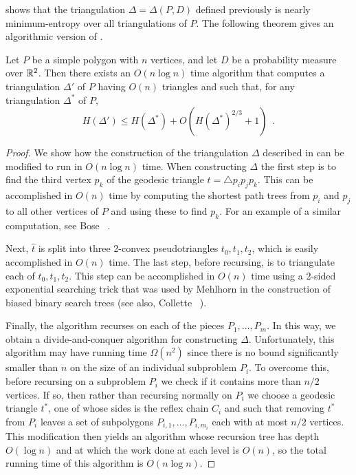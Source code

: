 \documentclass[lotsofwhite]{patmorin}
\newcommand{\z}[1]{{\hat{#1}}}
\begin{document}
 shows that the triangulation
$\Delta=\Delta(P,D)$ defined previously is nearly minimum-entropy over
all triangulations of $P$.  The following theorem gives an algorithmic
version of .

\begin{thm}
Let $P$ be a simple polygon with $n$ vertices, and let $D$ be a
probability measure over $\mathbb{R}^2$.  Then there exists an $O(n\log n)$
time algorithm that computes a triangulation $\Delta'$ of $P$ having
$O(n)$ triangles and such that, for any triangulation $\Delta^*$ of
$P$,
\[
    H(\Delta') \le H(\Delta^*) + O(H(\Delta^*)^{2/3}+1) \enspace .
\]
\end{thm}

\begin{proof}
We show how the construction of the triangulation $\Delta$ described in
 can be modified to run in $O(n\log n)$ time.  When
constructing $\Delta$ the first step is to find the third vertex $p_k$ of the
geodesic triangle $t=\triangle p_i p_j p_k$.  This can be accomplished
in $O(n)$ time by computing the shortest path trees from $p_i$ and
$p_j$ to all other vertices of $P$ and using these to find $p_k$.  For
an example of a similar computation, see Bose \etal\
\cite[Section~2.2]{bdhlim07}.

Next, $\z t$ is split into three 2-convex pseudotriangles $t_0,t_1,t_2$,
which is easily accomplished in $O(n)$ time.  The last step, before
recursing, is to triangulate each of $t_0,t_1,t_2$.  This step can be
accomplished in $O(n)$ time using a 2-sided exponential searching
trick that was used by Mehlhorn \cite{m75} in the construction of
biased binary search trees (see also, Collette \etal\
\cite[Theorem~1]{cdilm08}).

Finally, the algorithm recurses on each of the pieces
$P_1,\ldots,P_m$.  In this way, we obtain a divide-and-conquer
algorithm for constructing $\Delta$.  Unfortunately, this algorithm
may have running time $\Omega(n^2)$ since there is no bound
significantly smaller than $n$ on the size of an individual subproblem
$P_i$.  To overcome this, before recursing on a subproblem $P_i$ we
check if it contains more than $n/2$ vertices.  If so, then rather
than recursing normally on $P_i$ we choose a geodesic triangle $t^*$,
one of whose sides is the reflex chain $C_i$ and such that removing
$t^*$ from $P_i$ leaves a set of subpolygons
$P_{i,1},\ldots,P_{i,m_i}$ each with at most $n/2$ vertices.  This
modification then yields an algorithm whose recursion tree has depth
$O(\log n)$ and at which the work done at each level is $O(n)$, so the
total running time of this algorithm is $O(n\log n)$.


\end{proof}
\end{document}
